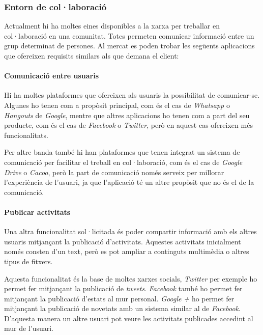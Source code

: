 \subsubsection{Entorn de col·laboració}

Actualment hi ha moltes eines disponibles a la xarxa per treballar en col·laboració en una comunitat. Totes permeten comunicar informació entre un grup determinat de persones. Al mercat es poden trobar les següents aplicacions que ofereixen requisits similars als que demana el client:

\paragraph{Comunicació entre usuaris\\}
Hi ha moltes plataformes que ofereixen als usuaris la possibilitat de comunicar-se. Algunes ho tenen com a propòsit principal, com és el cas de \textit{Whatsapp}\cite{whatsapp} o \textit{Hangouts}\cite{hangouts} de \textit{Google}, mentre que altres aplicacions ho tenen com a part del seu producte, com és el cas de \textit{Facebook}\cite{facebook} o \textit{Twitter}\cite{twitter}, però en aquest cas ofereixen més funcionalitats.

Per altre banda també hi han plataformes que tenen integrat un sistema de comunicació per facilitar el treball en col·laboració, com és el cas de \textit{Google Drive}\cite{g_drive} o \textit{Cacoo}\cite{cacoo}, però la part de comunicació només serveix per millorar l'experiència de l'usuari, ja que l'aplicació té un altre propòsit que no és el de la comunicació.

\paragraph{Publicar activitats\\}

Una altra funcionalitat sol·licitada és poder compartir informació amb els altres usuaris mitjançant la publicació d'activitats. Aquestes activitats inicialment només consten d'un text, però es pot ampliar a continguts multimèdia o altres tipus de fitxers.

Aquesta funcionalitat és la base de moltes xarxes socials, \textit{Twitter} per exemple ho permet fer mitjançant la publicació de \textit{tweets}. \textit{Facebook} també ho permet fer mitjançant la publicació d'estats al mur personal. \textit{Google +}\cite{g_plus} ho permet fer mitjançant la publicació de novetats amb un sistema similar al de \textit{Facebook}. D'aquesta manera un altre usuari pot veure les activitats publicades accedint al mur de l'usuari.

